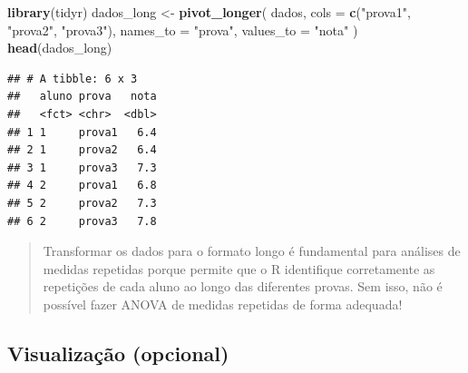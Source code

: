\documentclass[
]{book}
\newenvironment{Shaded}{\begin{snugshade}}{\end{snugshade}}
\newcommand{\AttributeTok}[1]{\textcolor[rgb]{0.13,0.29,0.53}{#1}}
\newcommand{\FunctionTok}[1]{\textcolor[rgb]{0.13,0.29,0.53}{\textbf{#1}}}
\newcommand{\NormalTok}[1]{#1}
\newcommand{\OtherTok}[1]{\textcolor[rgb]{0.56,0.35,0.01}{#1}}
\newcommand{\StringTok}[1]{\textcolor[rgb]{0.31,0.60,0.02}{#1}}
\begin{document}
\begin{Shaded}
\begin{Highlighting}[]
\FunctionTok{library}\NormalTok{(tidyr)}
\NormalTok{dados\_long }\OtherTok{\textless{}{-}} \FunctionTok{pivot\_longer}\NormalTok{(}
\NormalTok{  dados,}
  \AttributeTok{cols =} \FunctionTok{c}\NormalTok{(}\StringTok{"prova1"}\NormalTok{, }\StringTok{"prova2"}\NormalTok{, }\StringTok{"prova3"}\NormalTok{),}
  \AttributeTok{names\_to =} \StringTok{"prova"}\NormalTok{,}
  \AttributeTok{values\_to =} \StringTok{"nota"}
\NormalTok{)}
\FunctionTok{head}\NormalTok{(dados\_long)}
\end{Highlighting}
\end{Shaded}

\begin{verbatim}
## # A tibble: 6 x 3
##   aluno prova   nota
##   <fct> <chr>  <dbl>
## 1 1     prova1   6.4
## 2 1     prova2   6.4
## 3 1     prova3   7.3
## 4 2     prova1   6.8
## 5 2     prova2   7.3
## 6 2     prova3   7.8
\end{verbatim}

\begin{quote}
Transformar os dados para o formato longo é fundamental para análises de medidas repetidas porque permite que o R identifique corretamente as repetições de cada aluno ao longo das diferentes provas. Sem isso, não é possível fazer ANOVA de medidas repetidas de forma adequada!
\end{quote}

\subsection{Visualização (opcional)}\label{visualizauxe7uxe3o-opcional}
\end{document}
